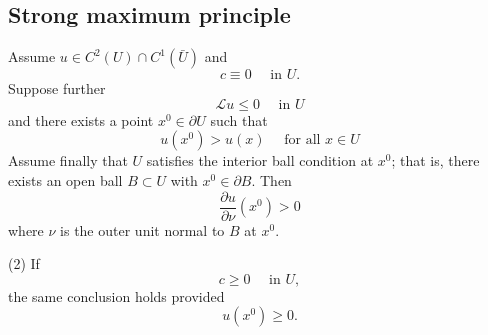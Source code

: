 \subsection{Strong maximum principle}

\begin{theorem}
    Assume $u \in C^2(U) \cap C^1(\bar{U})$ and
    \begin{equation*}
        c \equiv 0 \quad \text { in } U .
    \end{equation*}
    Suppose further
    \begin{equation*}
        \mathcal{L}u \leq 0 \quad \text { in } U
    \end{equation*}
    and there exists a point $x^0 \in \partial U$ such that
    \begin{equation*}
        u\left(x^0\right)>u(x) \quad \text { for all } x \in U
    \end{equation*}
    Assume finally that $U$ satisfies the interior ball condition at $x^0$; that is, there exists an open ball $B \subset U$ with $x^0 \in \partial B$. Then
    \begin{equation*}
        \frac{\partial u}{\partial \nu}\left(x^0\right)>0
    \end{equation*}
    where $\nu$ is the outer unit normal to $B$ at $x^0$.


    (2) If
    \begin{equation*}
        c \geq 0 \quad \text { in } U,
    \end{equation*}
    the same conclusion holds provided
    \begin{equation*}
        u\left(x^0\right) \geq 0 .
    \end{equation*}



\end{theorem}
